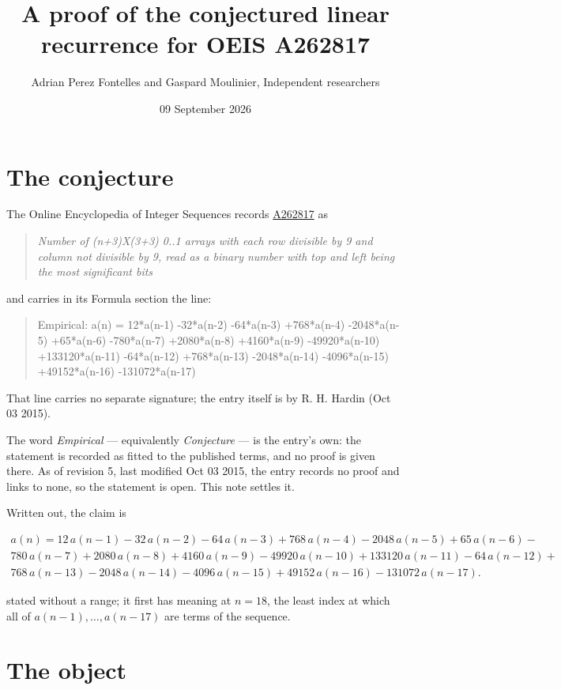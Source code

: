 \documentclass[11pt]{article}
\title{A proof of the conjectured linear recurrence for OEIS A262817}
\author{Adrian Perez Fontelles and Gaspard Moulinier, Independent researchers}
\date{09 September 2026}
\theoremstyle{definition}
\begin{document}
\maketitle
\section{The conjecture}

The Online Encyclopedia of Integer Sequences records \href{https://oeis.org/A262817}{A262817} as

\begin{quote}\itshape Number of (n+3)X(3+3) 0..1 arrays with each row divisible by 9 and column not divisible by 9, read as a binary number with top and left being the most significant bits\end{quote}

and carries in its Formula section the line:

\begin{quote}\ttfamily Empirical: a(n) = 12*a(n-1) -32*a(n-2) -64*a(n-3) +768*a(n-4) -2048*a(n-5) +65*a(n-6) -780*a(n-7) +2080*a(n-8) +4160*a(n-9) -49920*a(n-10) +133120*a(n-11) -64*a(n-12) +768*a(n-13) -2048*a(n-14) -4096*a(n-15) +49152*a(n-16) -131072*a(n-17)\end{quote}

That line carries no separate signature; the entry itself is by R. H. Hardin (Oct 03 2015).

The word {\itshape Empirical} --- equivalently {\itshape Conjecture} --- is the entry's own: the statement is recorded as fitted to the published terms, and no proof is given there. As of revision 5, last modified Oct 03 2015, the entry records no proof and links to none, so the statement is open. This note settles it.

Written out, the claim is

\begin{multline*} a(n) = 12\,a(n-1) - 32\,a(n-2) - 64\,a(n-3) + 768\,a(n-4) - 2048\,a(n-5) + 65\,a(n-6) - \\ 780\,a(n-7) + 2080\,a(n-8) + 4160\,a(n-9) - 49920\,a(n-10) + 133120\,a(n-11) - 64\,a(n-12) + \\ 768\,a(n-13) - 2048\,a(n-14) - 4096\,a(n-15) + 49152\,a(n-16) - 131072\,a(n-17). \end{multline*}

stated without a range; it first has meaning at $n = 18$, the least index at which all of $a(n-1),\dots,a(n-17)$ are terms of the sequence.

\section{The object}
\end{document}
